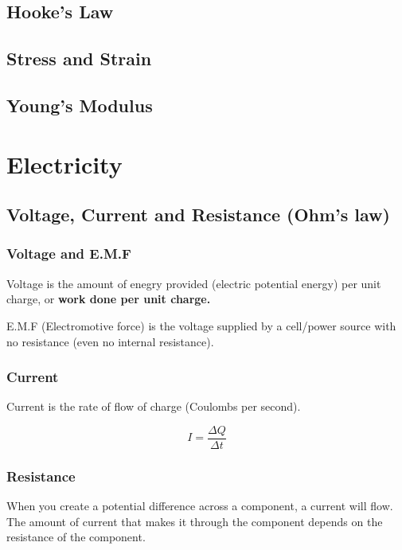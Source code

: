 \documentclass[a4paper, 12pt]{article}
\begin{document}
\subsection{Hooke's Law}

\subsection{Stress and Strain}

\subsection{Young's Modulus}


\newpage
\section{Electricity}

\subsection{Voltage, Current and Resistance (Ohm's law)}

\subsubsection{Voltage and E.M.F}

Voltage is the amount of enegry provided (electric potential energy) per unit charge, or \textbf{work done per unit charge.}

E.M.F (Electromotive force) is the voltage supplied by a cell/power source with no resistance (even no internal resistance).

\subsubsection{Current}

Current is the rate of flow of charge (Coulombs per second).

$$
I = \frac{\Delta Q}{\Delta t}
$$

\subsubsection{Resistance}

When you create a potential difference across a component, a current will flow. The amount of current that makes it through the component depends on the resistance of the component.
\end{document}
